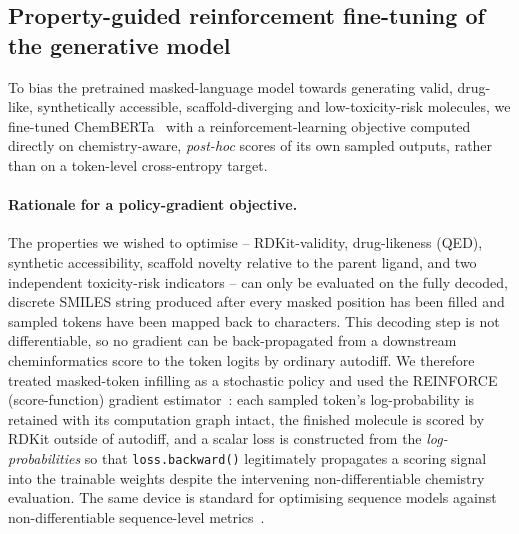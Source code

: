 %

\subsection*{Property-guided reinforcement fine-tuning of the generative model}
\label{sec:stage9}

To bias the pretrained masked-language model towards generating valid,
drug-like, synthetically accessible, scaffold-diverging and low-toxicity-risk
molecules, we fine-tuned ChemBERTa~\cite{chithrananda2020chemberta} with a
reinforcement-learning objective computed directly on chemistry-aware,
\emph{post-hoc} scores of its own sampled outputs, rather than on a
token-level cross-entropy target.

\paragraph{Rationale for a policy-gradient objective.}
The properties we wished to optimise -- RDKit-validity, drug-likeness (QED),
synthetic accessibility, scaffold novelty relative to the parent ligand, and
two independent toxicity-risk indicators -- can only be evaluated on the
fully decoded, discrete SMILES string produced after every masked position
has been filled and sampled tokens have been mapped back to characters. This
decoding step is not differentiable, so no gradient can be back-propagated
from a downstream cheminformatics score to the token logits by ordinary
autodiff. We therefore treated masked-token infilling as a stochastic policy
and used the REINFORCE (score-function) gradient
estimator~\cite{williams1992reinforce,suttonbarto2018}: each sampled token's
log-probability is retained with its computation graph intact, the finished
molecule is scored by RDKit outside of autodiff, and a scalar loss is
constructed from the \emph{log-probabilities} so that \texttt{loss.backward()}
legitimately propagates a scoring signal into the trainable weights despite
the intervening non-differentiable chemistry evaluation. The same device is
standard for optimising sequence models against non-differentiable
sequence-level metrics~\cite{ranzato2016mixer,rennie2017scst}.

